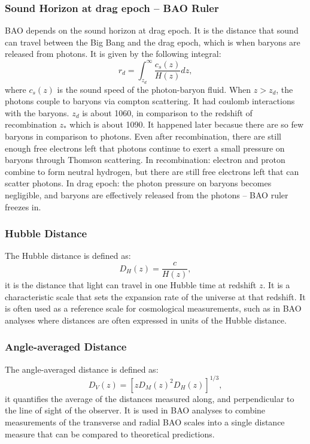 \documentclass{article}
\begin{document}
\subsubsection{Sound Horizon at drag epoch -- BAO Ruler}
BAO depends on the sound horizon at drag epoch. It is the distance that sound can travel between the Big Bang and the drag epoch, which is when baryons are released from photons. It is given by the following integral:
\begin{equation}
		r_d = \int_{z_d}^\infty \frac{c_s(z)}{H(z)} dz,
\end{equation}
where $c_s(z)$ is the sound speed of the photon-baryon fluid. When $z > z_d$, the photons couple to baryons via compton scattering. It had coulomb interactions with the baryons. $z_d$ is about 1060, in comparison to the redshift of recombination $z_*$ which is about 1090. It happened later becasue there are so few baryons in comparison to photons. Even after recombination, there are still enough free electrons left that photons continue to exert a small pressure on baryons through Thomson scattering. In recombination: electron and proton combine to form neutral hydrogen, but there are still free electrons left that can scatter photons. In drag epoch: the photon pressure on baryons becomes negligible, and baryons are effectively released from the photons -- BAO ruler freezes in.

\subsubsection{Hubble Distance}
The Hubble distance is defined as:
\begin{equation}
		D_H(z) = \frac{c}{H(z)},
\end{equation}
it is the distance that light can travel in one Hubble time at redshift $z$. It is a characteristic scale that sets the expansion rate of the universe at that redshift. It is often used as a reference scale for cosmological measurements, such as in BAO analyses where distances are often expressed in units of the Hubble distance.

\subsubsection{Angle-averaged Distance}
The angle-averaged distance is defined as:
\begin{equation}
		D_V(z) = \left[ z D_M(z)^2 D_H(z) \right]^{1/3},
\end{equation}
it quantifies the average of the distances measured along, and perpendicular to the line of sight of the observer. It is used in BAO analyses to combine measurements of the transverse and radial BAO scales into a single distance measure that can be compared to theoretical predictions.
\end{document}
